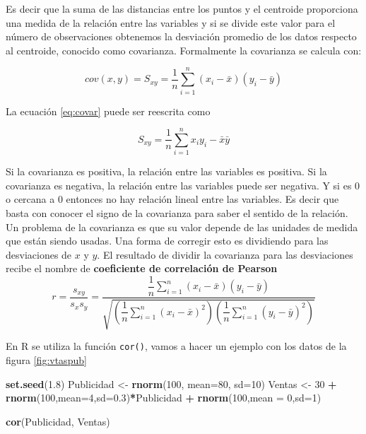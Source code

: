 \documentclass[letterpaper,]{book}
\newenvironment{Shaded}{\begin{snugshade}}{\end{snugshade}}
\newcommand{\DataTypeTok}[1]{\textcolor[rgb]{0.13,0.29,0.53}{#1}}
\newcommand{\DecValTok}[1]{\textcolor[rgb]{0.00,0.00,0.81}{#1}}
\newcommand{\FloatTok}[1]{\textcolor[rgb]{0.00,0.00,0.81}{#1}}
\newcommand{\KeywordTok}[1]{\textcolor[rgb]{0.13,0.29,0.53}{\textbf{#1}}}
\newcommand{\NormalTok}[1]{#1}
\newcommand{\OperatorTok}[1]{\textcolor[rgb]{0.81,0.36,0.00}{\textbf{#1}}}
\newcommand{\StringTok}[1]{\textcolor[rgb]{0.31,0.60,0.02}{#1}}
\begin{document}
Es decir que la suma de las distancias entre los puntos y el centroide proporciona una medida de la relación entre las variables y si se divide este valor para el número de observaciones obtenemos la desviación promedio de los datos respecto al centroide, conocido como covarianza. Formalmente la covarianza se calcula con:

\begin{equation} 
  cov(x,y) = S_{xy} = \dfrac{1}{n} \sum_{i=1}^{n}\left(x_i-\bar{x}\right)\left(y_i-\bar{y}\right)
  \label{eq:covar}
\end{equation}

La ecuación \eqref{eq:covar} puede ser reescrita como

\begin{equation} 
  S_{xy} = \dfrac{1}{n}\sum_{i=1}^{n}{x_iy_i}-\bar{x}\bar{y}
  \label{eq:covar2}
\end{equation}

Si la covarianza es positiva, la relación entre las variables es positiva. Si la covarianza es negativa, la relación entre las variables puede ser negativa. Y si es \(0\) o cercana a \(0\) entonces no hay relación lineal entre las variables. Es decir que basta con conocer el signo de la covarianza para saber el sentido de la relación. Un problema de la covarianza es que su valor depende de las unidades de medida que están siendo usadas. Una forma de corregir esto es dividiendo para las desviaciones de \(x\) y \(y\). El resultado de dividir la covarianza para las desviaciones recibe el nombre de \textbf{coeficiente de correlación de Pearson}
\begin{equation} 
  r=\dfrac{s_{xy}}{s_xs_y}=\dfrac{\dfrac{1}{n} \sum_{i=1}^{n}\left(x_i-\bar{x}\right)\left(y_i-\bar{y}\right)}{\sqrt{\left(\dfrac{1}{n} \sum_{i=1}^{n}\left(x_i-\bar{x}\right)^2\right)\left(\dfrac{1}{n} \sum_{i=1}^{n}\left(y_i-\bar{y}\right)^2\right)}}
  \label{eq:covar3}
\end{equation}

En R se utiliza la función \texttt{cor()}, vamos a hacer un ejemplo con los datos de la figura \ref{fig:vtaspub}

\begin{Shaded}
\begin{Highlighting}[]
\KeywordTok{set.seed}\NormalTok{(}\FloatTok{1.8}\NormalTok{)}
\NormalTok{Publicidad <-}\StringTok{ }\KeywordTok{rnorm}\NormalTok{(}\DecValTok{100}\NormalTok{, }\DataTypeTok{mean=}\DecValTok{80}\NormalTok{, }\DataTypeTok{sd=}\DecValTok{10}\NormalTok{)}
\NormalTok{Ventas <-}\StringTok{ }\DecValTok{30} \OperatorTok{+}\StringTok{ }\KeywordTok{rnorm}\NormalTok{(}\DecValTok{100}\NormalTok{,}\DataTypeTok{mean=}\DecValTok{4}\NormalTok{,}\DataTypeTok{sd=}\FloatTok{0.3}\NormalTok{)}\OperatorTok{*}\NormalTok{Publicidad }\OperatorTok{+}\StringTok{ }\KeywordTok{rnorm}\NormalTok{(}\DecValTok{100}\NormalTok{,}\DataTypeTok{mean =} \DecValTok{0}\NormalTok{,}\DataTypeTok{sd=}\DecValTok{1}\NormalTok{)}

\KeywordTok{cor}\NormalTok{(Publicidad, Ventas)}
\end{Highlighting}
\end{Shaded}
\end{document}

